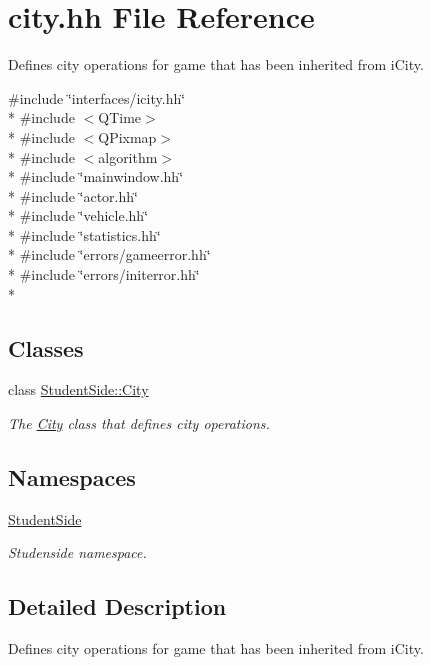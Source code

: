 \hypertarget{city_8hh}{\section{city.\-hh File Reference}
\label{city_8hh}
}


Defines city operations for game that has been inherited from i\-City.  


{\ttfamily \#include \char`\"{}interfaces/icity.\-hh\char`\"{}}\\*
{\ttfamily \#include $<$Q\-Time$>$}\\*
{\ttfamily \#include $<$Q\-Pixmap$>$}\\*
{\ttfamily \#include $<$algorithm$>$}\\*
{\ttfamily \#include \char`\"{}mainwindow.\-hh\char`\"{}}\\*
{\ttfamily \#include \char`\"{}actor.\-hh\char`\"{}}\\*
{\ttfamily \#include \char`\"{}vehicle.\-hh\char`\"{}}\\*
{\ttfamily \#include \char`\"{}statistics.\-hh\char`\"{}}\\*
{\ttfamily \#include \char`\"{}errors/gameerror.\-hh\char`\"{}}\\*
{\ttfamily \#include \char`\"{}errors/initerror.\-hh\char`\"{}}\\*
\subsection*{Classes}
\begin{DoxyCompactItemize}
\item 
class \hyperlink{class_student_side_1_1_city}{Student\-Side\-::\-City}
\begin{DoxyCompactList}\small\item\em The \hyperlink{class_student_side_1_1_city}{City} class that defines city operations. \end{DoxyCompactList}\end{DoxyCompactItemize}
\subsection*{Namespaces}
\begin{DoxyCompactItemize}
\item 
\hyperlink{namespace_student_side}{Student\-Side}
\begin{DoxyCompactList}\small\item\em Studenside namespace. \end{DoxyCompactList}\end{DoxyCompactItemize}


\subsection{Detailed Description}
Defines city operations for game that has been inherited from i\-City. 